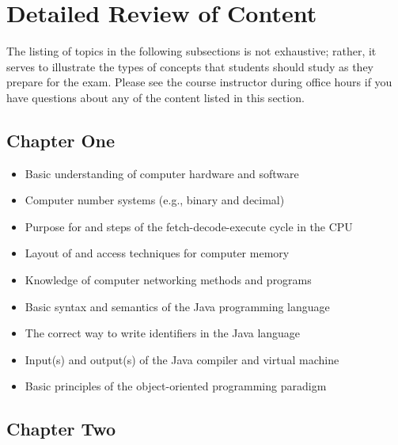 \vspace*{-.15in}
\section*{Detailed Review of Content}
\vspace*{-.1in}

The listing of topics in the following subsections is not exhaustive; rather, it serves to illustrate the types of
concepts that students should study as they prepare for the exam. Please see the course instructor during office hours
if you have questions about any of the content listed in this section.

\vspace*{-.1in}
\subsection*{Chapter One}

\begin{itemize}

  \itemsep 0in
  \item Basic understanding of computer hardware and software
  \item Computer number systems (e.g., binary and decimal)
  \item Purpose for and steps of the fetch-decode-execute cycle in the CPU
  \item Layout of and access techniques for computer memory
  \item Knowledge of computer networking methods and programs
  \item Basic syntax and semantics of the Java programming language
  \item The correct way to write identifiers in the Java language
  \item Input(s) and output(s) of the Java compiler and virtual machine
  \item Basic principles of the object-oriented programming paradigm

\end{itemize}

\vspace*{-.2in}
\subsection*{Chapter Two}
\vspace*{-.1in}

